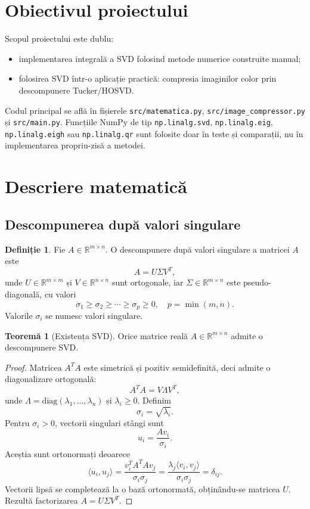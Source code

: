 \documentclass[12pt,a4paper]{article}
\theoremstyle{definition}
\newtheorem{definitie}{Definiție}[section]
\newtheorem{teorema}{Teoremă}[section]
\begin{document}
\tableofcontents
\newpage


\section{Obiectivul proiectului}

Scopul proiectului este dublu:
\begin{itemize}
  \item implementarea integrală a SVD folosind metode numerice construite manual;
  \item folosirea SVD într-o aplicație practică: compresia imaginilor color prin descompunere Tucker/HOSVD.
\end{itemize}

Codul principal se află în fișierele \texttt{src/matematica.py}, \texttt{src/image\_compressor.py} și \texttt{src/main.py}. Funcțiile NumPy de tip \texttt{np.linalg.svd}, \texttt{np.linalg.eig}, \texttt{np.linalg.eigh} sau \texttt{np.linalg.qr} sunt folosite doar în teste și comparații, nu în implementarea propriu-zisă a metodei.

\section{Descriere matematică}

\subsection{Descompunerea după valori singulare}

\begin{definitie}
Fie $A \in \mathbb{R}^{m \times n}$. O descompunere după valori singulare a matricei $A$ este
\[
  A = U \Sigma V^T,
\]
unde $U \in \mathbb{R}^{m \times m}$ și $V \in \mathbb{R}^{n \times n}$ sunt ortogonale, iar $\Sigma \in \mathbb{R}^{m \times n}$ este pseudo-diagonală, cu valori
\[
  \sigma_1 \geq \sigma_2 \geq \cdots \geq \sigma_p \geq 0,\quad p=\min(m,n).
\]
Valorile $\sigma_i$ se numesc valori singulare.
\end{definitie}

\begin{teorema}[Existența SVD]
Orice matrice reală $A \in \mathbb{R}^{m \times n}$ admite o descompunere SVD.
\end{teorema}

\begin{proof}
Matricea $A^T A$ este simetrică și pozitiv semidefinită, deci admite o diagonalizare ortogonală:
\[
  A^T A = V \Lambda V^T,
\]
unde $\Lambda=\mathrm{diag}(\lambda_1,\ldots,\lambda_n)$ și $\lambda_i \geq 0$. Definim
\[
  \sigma_i=\sqrt{\lambda_i}.
\]
Pentru $\sigma_i>0$, vectorii singulari stângi sunt
\[
  u_i=\frac{A v_i}{\sigma_i}.
\]
Aceștia sunt ortonormați deoarece
\[
  \langle u_i,u_j\rangle=
  \frac{v_i^T A^T A v_j}{\sigma_i\sigma_j}
  =
  \frac{\lambda_j \langle v_i,v_j\rangle}{\sigma_i\sigma_j}
  =
  \delta_{ij}.
\]
Vectorii lipsă se completează la o bază ortonormată, obținându-se matricea $U$. Rezultă factorizarea $A=U\Sigma V^T$.
\end{proof}
\end{document}
